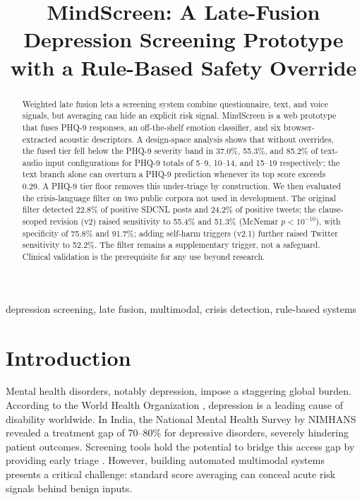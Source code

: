 \documentclass[conference]{IEEEtran}
\begin{document}
\title{MindScreen: A Late-Fusion Depression Screening Prototype with a Rule-Based Safety Override}

\author{
}

\maketitle

\begin{abstract}
Weighted late fusion lets a screening system combine questionnaire, text, and voice signals, but averaging can hide an explicit risk signal. MindScreen is a web prototype that fuses PHQ-9 responses, an off-the-shelf emotion classifier, and six browser-extracted acoustic descriptors. A design-space analysis shows that without overrides, the fused tier fell below the PHQ-9 severity band in 37.0\%, 55.3\%, and 85.2\% of text-audio input configurations for PHQ-9 totals of 5--9, 10--14, and 15--19 respectively; the text branch alone can overturn a PHQ-9 prediction whenever its top score exceeds 0.29. A PHQ-9 tier floor removes this under-triage by construction. We then evaluated the crisis-language filter on two public corpora not used in development. The original filter detected 22.8\% of positive SDCNL posts and 24.2\% of positive tweets; the clause-scoped revision (v2) raised sensitivity to 55.4\% and 51.3\% (McNemar $p < 10^{-10}$), with specificity of 75.8\% and 91.7\%; adding self-harm triggers (v2.1) further raised Twitter sensitivity to 52.2\%. The filter remains a supplementary trigger, not a safeguard. Clinical validation is the prerequisite for any use beyond research.
\end{abstract}

\begin{IEEEkeywords}
depression screening, late fusion, multimodal, crisis detection, rule-based systems
\end{IEEEkeywords}

\section{Introduction}
Mental health disorders, notably depression, impose a staggering global burden. According to the World Health Organization \cite{who_depression}, depression is a leading cause of disability worldwide. In India, the National Mental Health Survey by NIMHANS \cite{nimhans_nmhs} revealed a treatment gap of 70--80\% for depressive disorders, severely hindering patient outcomes. Screening tools hold the potential to bridge this access gap by providing early triage \cite{sutton_cdss}. However, building automated multimodal systems presents a critical challenge: standard score averaging can conceal acute risk signals behind benign inputs.
\end{document}
